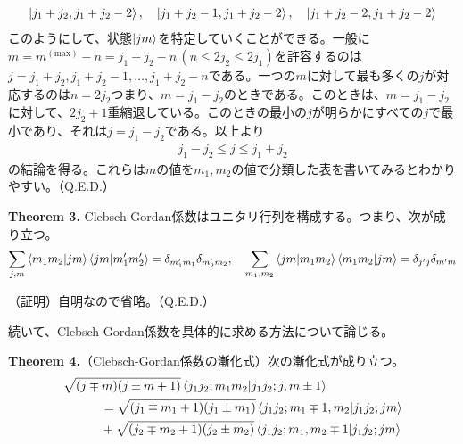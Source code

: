 \documentclass[dvipdfmx]{jarticle}
\theoremstyle{plain}
\begin{document}
\begin{enumerate}
        \begin{align}
          \ket{j_1 + j_2, j_1 + j_2 - 2}, \quad \ket{j_1 + j_2 - 1, j_1 + j_2 - 2}, \quad \ket{j_1 + j_2 - 2, j_1 + j_2 - 2}
        \end{align}
        このようにして、状態$\ket{jm}$を特定していくことができる。一般に$m = m^{(\mathrm{max})} - n = j_1 + j_2 - n\, (n \leq 2j_2 \leq 2j_1)$を許容するのは$j = j_1 + j_2, j_1 + j_2 - 1, \dots ,j_1 + j_2 - n$である。一つの$m$に対して最も多くの$j$が対応するのは$n = 2j_2$つまり、$m = j_1 - j_2$のときである。このときは、$m = j_1 - j_2$に対して、$2j_2 + 1$重縮退している。このときの最小の$j$が明らかにすべての$j$で最小であり、それは$j = j_1 - j_2$である。以上より
        \begin{align}
          j_1 - j_2 \leq j \leq j_1 + j_2
        \end{align}
        の結論を得る。これらは$m$の値を$m_1, m_2$の値で分類した表を書いてみるとわかりやすい。\hfill（Q.E.D.）

        \textbf{Theorem 3.} Clebsch-Gordan係数はユニタリ行列を構成する。つまり、次が成り立つ。
        \begin{align}
          \sum_{j, m} \bra{m_1m_2}\ket{jm}\bra{jm}\ket{m_1'm_2'} = \delta_{m_1'm_1}\delta_{m_2'm_2},\quad \sum_{m_1, m_2} \bra{jm}\ket{m_1m_2}\bra{m_1m_2}\ket{jm} = \delta_{j'j}\delta_{m'm}
        \end{align}

        （証明）自明なので省略。\hfill（Q.E.D.）

        続いて、Clebsch-Gordan係数を具体的に求める方法について論じる。
        
        \textbf{Theorem 4.}（Clebsch-Gordan係数の漸化式）次の漸化式が成り立つ。
        \begin{align}
          &\sqrt{(j\mp m)(j \pm m + 1)}\bra{j_1j_2;m_1m_2}\ket{j_1j_2;j,m\pm 1}\\
          &\quad \quad\quad= \sqrt{(j_1 \mp m_1 + 1)(j_1 \pm m_1)} \bra{j_1j_2;m_1\mp1, m_2}\ket{j_1j_2; jm}\\
          &\quad \quad\quad+ \sqrt{(j_2 \mp m_2 + 1)(j_2 \pm m_2)} \bra{j_1j_2;m_1, m_2\mp 1}\ket{j_1j_2; jm}
        \end{align}


\end{enumerate}
\end{document}
